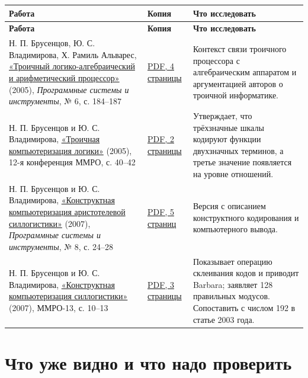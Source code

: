 \documentclass[12pt,a4paper]{article}
\begin{document}
\begin{longtable}{P{0.260\textwidth}P{0.300\textwidth}P{0.360\textwidth}}
\toprule
\textbf{Работа} & \textbf{Копия} & \textbf{Что исследовать} \\
\midrule
\endfirsthead
\toprule
\textbf{Работа} & \textbf{Копия} & \textbf{Что исследовать} \\
\midrule
\endhead
Н. П. Брусенцов, Ю. С. Владимирова, Х. Рамиль Альварес, \href{https://ternarycomp.cs.msu.ru/Papers/Sborn6.pdf}{«Троичный логико-алгебраический и арифметический процессор»} (2005), \emph{Программные системы и инструменты}, № 6, с. 184–187 & \href{../sources/pdfs/Брусенцов_Владимирова_Рамиль-Альварес_Троичный-логико-алгебраический-процессор_2005.pdf}{PDF, 4 страницы} & Контекст связи троичного процессора с алгебраическим аппаратом и аргументацией авторов о троичной информатике. \\
Н. П. Брусенцов и Ю. С. Владимирова, \href{https://ternarycomp.cs.msu.ru/Papers/MMRO12.pdf}{«Троичная компьютеризация логики»} (2005), 12-я конференция ММРО, с. 40–42 & \href{../sources/pdfs/Брусенцов_Владимирова_Троичная-компьютеризация-логики_2005_ММРО-12.pdf}{PDF, 2 страницы} & Утверждает, что трёхзначные шкалы кодируют функции двухзначных терминов, а третье значение появляется на уровне отношений. \\
Н. П. Брусенцов и Ю. С. Владимирова, \href{https://ternarycomp.cs.msu.ru/Papers/Sborn8.pdf}{«Конструктная компьютеризация аристотелевой силлогистики»} (2007), \emph{Программные системы и инструменты}, № 8, с. 24–28 & \href{../sources/pdfs/Брусенцов_Владимирова_Конструктная-компьютеризация-силлогистики_2007_ПСИ-8.pdf}{PDF, 5 страниц} & Версия с описанием конструктного кодирования и компьютерного вывода. \\
Н. П. Брусенцов и Ю. С. Владимирова, \href{https://ternarycomp.cs.msu.ru/Papers/MMRO13.pdf}{«Конструктная компьютеризация силлогистики»} (2007), ММРО-13, с. 10–13 & \href{../sources/pdfs/Брусенцов_Владимирова_Конструктная-компьютеризация-силлогистики_2007_ММРО-13.pdf}{PDF, 3 страницы} & Показывает операцию склеивания кодов и приводит Barbara; заявляет 128 правильных модусов. Сопоставить с числом 192 в статье 2003 года. \\
\bottomrule
\end{longtable}

\section{Что уже видно и что надо проверить}
\end{document}
